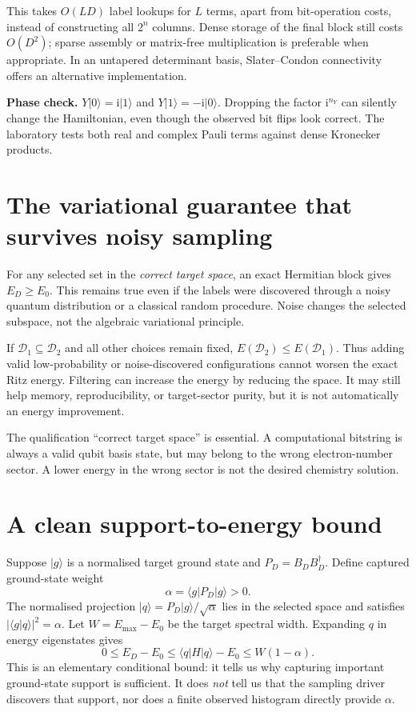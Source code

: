 \documentclass[11pt,a4paper,oneside]{report}
\newcommand{\ket}[1]{\lvert #1\rangle}
\newcommand{\bra}[1]{\langle #1\rvert}
\newcommand{\braket}[2]{\langle #1\vert #2\rangle}
\newcommand{\abs}[1]{\left\lvert #1\right\rvert}
\newcommand{\Dset}{\mathcal D}
\newcommand{\I}{\mathrm i}
\begin{document}
This takes $O(LD)$ label lookups for $L$ terms, apart from bit-operation costs, instead of constructing all $2^n$ columns. Dense storage of the final block still costs $O(D^2)$; sparse assembly or matrix-free multiplication is preferable when appropriate. In an untapered determinant basis, Slater--Condon connectivity offers an alternative implementation.

\textbf{Phase check.} $Y\ket0=\I\ket1$ and $Y\ket1=-\I\ket0$. Dropping the factor $\I^{n_Y}$ can silently change the Hamiltonian, even though the observed bit flips look correct. The laboratory tests both real and complex Pauli terms against dense Kronecker products.

\section{The variational guarantee that survives noisy sampling}
For any selected set in the \emph{correct target space}, an exact Hermitian block gives $E_D\ge E_0$. This remains true even if the labels were discovered through a noisy quantum distribution or a classical random procedure. Noise changes the selected subspace, not the algebraic variational principle.

If $\Dset_1\subseteq\Dset_2$ and all other choices remain fixed, $E(\Dset_2)\le E(\Dset_1)$. Thus adding valid low-probability or noise-discovered configurations cannot worsen the exact Ritz energy. Filtering can increase the energy by reducing the space. It may still help memory, reproducibility, or target-sector purity, but it is not automatically an energy improvement.

The qualification ``correct target space'' is essential. A computational bitstring is always a valid qubit basis state, but may belong to the wrong electron-number sector. A lower energy in the wrong sector is not the desired chemistry solution.

\section{A clean support-to-energy bound}
Suppose $\ket g$ is a normalised target ground state and $P_D=B_DB_D^\dagger$. Define captured ground-state weight
\begin{equation}
\alpha=\bra gP_D\ket g>0.
\end{equation}
The normalised projection $\ket q=P_D\ket g/\sqrt\alpha$ lies in the selected space and satisfies $\abs{\braket gq}^2=\alpha$. Let $W=E_{\max}-E_0$ be the target spectral width. Expanding $q$ in energy eigenstates gives
\begin{equation}\label{eq:captured}
\boxed{0\le E_D-E_0\le\bra qH\ket q-E_0\le W(1-\alpha).}
\end{equation}
This is an elementary conditional bound: it tells us why capturing important ground-state support is sufficient. It does \emph{not} tell us that the sampling driver discovers that support, nor does a finite observed histogram directly provide $\alpha$.
\end{document}
